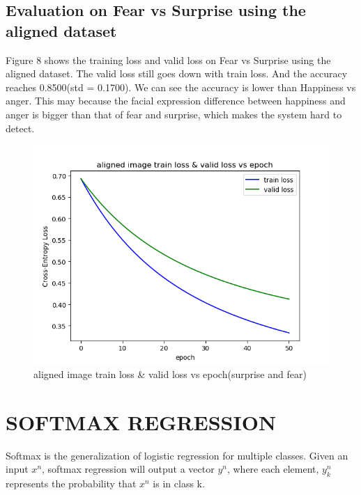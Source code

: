 \documentclass{article} %
\begin{document}
\subsection {Evaluation on Fear vs Surprise using the aligned dataset}
Figure 8 shows the training loss and valid loss on Fear vs Surprise using the aligned dataset. The valid loss still goes down with train loss. And the accuracy reaches 0.8500(std = 0.1700). We can see the accuracy is lower than Happiness vs anger. This may because the facial expression difference between happiness and anger is bigger than that of fear and surprise, which makes the system hard to detect. 
\begin{figure}[h]
	\centering
	\includegraphics[scale=0.5]{./graph/aligned_angerfear.png}
	\caption{aligned image train loss \& valid loss vs epoch(surprise and fear)}
\end{figure}

\section{SOFTMAX REGRESSION}
Softmax is the generalization of logistic regression for multiple classes. Given an input $x^n$, softmax regression will output a vector $y^n$, where each element, $y_k^n$ represents the probability that $x^n$ is in class k.
\end{document}
